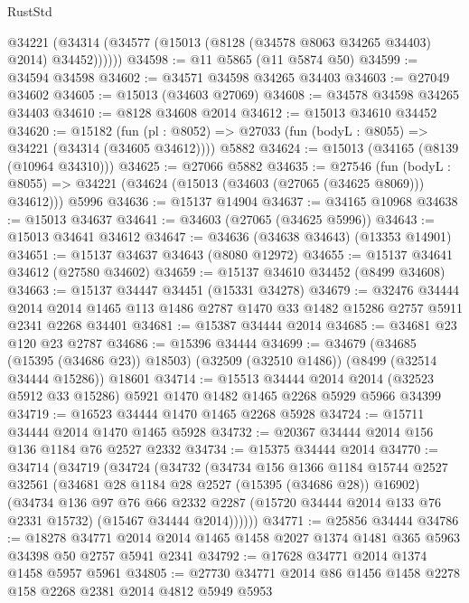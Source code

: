 \begin{lexlean}{RustStd}
\begin{coremodule}
        @34221 (@34314 (@34577 (@15013 (@8128 (@34578 @8063 @34265 @34403) @2014) @34452))))))
@34598 := @11 @5865 (@11 @5874 @50)
@34599 := @34594 @34598
@34602 := @34571 @34598 @34265 @34403
@34603 := @27049 @34602
@34605 := @15013 (@34603 @27069)
@34608 := @34578 @34598 @34265 @34403
@34610 := @8128 @34608 @2014
@34612 := @15013 @34610 @34452
@34620 := @15182
    (fun (pl : @8052) => @27033 (fun (bodyL : @8055) => @34221 (@34314 (@34605 @34612))))
    @5882
@34624 := @15013 (@34165 (@8139 (@10964 @34310)))
@34625 := @27066 @5882
@34635 := @27546
    (fun (bodyL : @8055) => @34221 (@34624 (@15013 (@34603 (@27065 (@34625 @8069))) @34612)))
    @5996
@34636 := @15137 @14904
@34637 := @34165 @10968
@34638 := @15013 @34637
@34641 := @34603 (@27065 (@34625 @5996))
@34643 := @15013 @34641 @34612
@34647 := @34636 (@34638 @34643) (@13353 @14901)
@34651 := @15137 @34637 @34643 (@8080 @12972)
@34655 := @15137 @34641 @34612 (@27580 @34602)
@34659 := @15137 @34610 @34452 (@8499 @34608)
@34663 := @15137 @34447 @34451 (@15331 @34278)
@34679 := @32476
    @34444
    @2014
    @2014
    @1465
    @113
    @1486
    @2787
    @1470
    @33
    @1482
    @15286
    @2757
    @5911
    @2341
    @2268
    @34401
@34681 := @15387 @34444 @2014
@34685 := @34681 @23 @120 @23 @2787
@34686 := @15396 @34444
@34699 := @34679
    (@34685 (@15395 (@34686 @23)) @18503)
    (@32509 (@32510 @1486))
    (@8499 (@32514 @34444 @15286))
    @18601
@34714 := @15513
    @34444
    @2014
    @2014
    (@32523 @5912 @33 @15286)
    @5921
    @1470
    @1482
    @1465
    @2268
    @5929
    @5966
    @34399
@34719 := @16523 @34444 @1470 @1465 @2268 @5928
@34724 := @15711 @34444 @2014 @1470 @1465 @5928
@34732 := @20367 @34444 @2014 @156 @136 @1184 @76 @2527 @2332
@34734 := @15375 @34444 @2014
@34770 := @34714
    (@34719
      (@34724
        (@34732
          (@34734
            @156
            @1366
            @1184
            @15744
            @2527
            @32561
            (@34681 @28 @1184 @28 @2527 (@15395 (@34686 @28)) @16902)
            (@34734
              @136
              @97
              @76
              @66
              @2332
              @2287
              (@15720 @34444 @2014 @133 @76 @2331 @15732)
              (@15467 @34444 @2014))))))
@34771 := @25856 @34444
@34786 := @18278
    @34771
    @2014
    @2014
    @1465
    @1458
    @2027
    @1374
    @1481
    @365
    @5963
    @34398
    @50
    @2757
    @5941
    @2341
@34792 := @17628 @34771 @2014 @1374 @1458 @5957 @5961
@34805 := @27730 @34771 @2014 @86 @1456 @1458 @2278 @158 @2268 @2381 @2014 @4812 @5949 @5953

\end{coremodule}
\end{lexlean}
